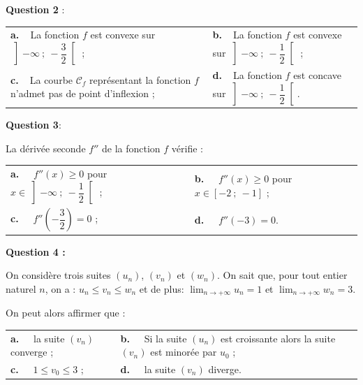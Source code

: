 \documentclass[10pt]{article}
\begin{document}
\textbf{Question 2 }:

\begin{center}
\begin{tabularx}{\linewidth}{X X}
\textbf{a.~~}La fonction $f$ est convexe sur $\left]- \infty~;~- \dfrac32\right[$ ;&
\textbf{b.~~}La fonction $f$ est convexe sur $\left]- \infty~;~- \dfrac12\right[$ ;\\
\textbf{c.~~}La courbe $\mathcal{C}_f$ représentant la fonction $f$ n'admet pas de point d'inflexion ; &\textbf{d.~~}La fonction $f$ est concave sur $\left] - \infty~;~- \dfrac12\right[$.
\end{tabularx}
\end{center}

\medskip

\textbf{Question 3}:

La dérivée seconde $f''$ de la fonction $f$ vérifie :

\begin{center}
\begin{tabularx}{\linewidth}{X X}
\textbf{a.~~} $f''(x) \geqslant  0$ pour $x \in \left]-\infty~;~- \dfrac12\right[$ ; &\textbf{b.~~} $f''(x) \geqslant  0$ pour $x \in [- 2~;~- 1]$ ;\\
\textbf{c.~~} $f''\left(- \dfrac32 \right) = 0$ ;&\textbf{d.~~} $f''(- 3) = 0$.
\end{tabularx}
\end{center}


\textbf{Question 4 :}

\medskip

On considère trois suites $\left(u_n\right)$, $\left(v_n\right)$ et $\left(w_n\right)$. On sait que, pour tout entier naturel $n$, on a : $u_n \leqslant v_n\leqslant  w_n$ et de plus: $\displaystyle\lim_{n \to + \infty} u_n= 1$ et $\displaystyle\lim_{n \to + \infty} w_n= 3$.

On peut alors affirmer que :

\begin{center}
\begin{tabularx}{\linewidth}{X X}
\textbf{a.~~} la suite $\left(v_n\right)$ converge ;&\textbf{b.~~} Si la suite 
$\left(u_n\right)$ est croissante alors la suite $\left(v_n\right)$ est minorée par $u_0$ ;\\
\textbf{c.~~} $1 \leqslant  v_0 \leqslant 3$ ;&\textbf{d.~~} la suite $\left(v_n\right)$ diverge.
\end{tabularx}
\end{center}


\medskip
\end{document}
